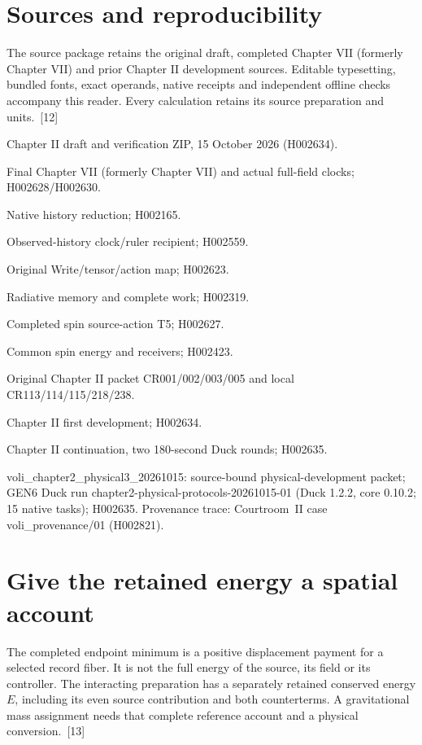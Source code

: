 \documentclass[10pt,twocolumn,letterpaper]{article}
\begin{document}
\section{Sources and reproducibility}
The source package retains the original draft, completed Chapter VII (formerly Chapter VII) and prior Chapter II development sources. Editable typesetting, bundled fonts, exact operands, native receipts and independent offline checks accompany this reader. Every calculation retains its source preparation and units.~[12]

\begingroup\footnotesize\raggedright
\noindent[1] Chapter II draft and verification ZIP, 15 October 2026 (H002634).

\noindent[2] Final Chapter VII (formerly Chapter VII) and actual full-field clocks; H002628/H002630.

\noindent[3] Native history reduction; H002165.

\noindent[4] Observed-history clock/ruler recipient; H002559.

\noindent[5] Original Write/tensor/action map; H002623.

\noindent[6] Radiative memory and complete work; H002319.

\noindent[7] Completed spin source-action T5; H002627.

\noindent[8] Common spin energy and receivers; H002423.

\noindent[9] Original Chapter II packet CR001/002/003/005 and local CR113/114/115/218/238.

\noindent[10] Chapter II first development; H002634.

\noindent[11] Chapter II continuation, two 180-second Duck rounds; H002635.

\noindent[12] voli\_chapter2\_physical3\_20261015: source-bound physical-development packet; GEN6 Duck run chapter2-physical-protocols-20261015-01 (Duck 1.2.2, core 0.10.2; 15 native tasks); H002635. Provenance trace: Courtroom~II case voli\_provenance/01 (H002821).

\par\endgroup


\section{Give the retained energy a spatial account}
The completed endpoint minimum is a positive displacement payment for a selected record fiber. It is not the full energy of the source, its field or its controller. The interacting preparation has a separately retained conserved energy $E$, including its even source contribution and both counterterms. A gravitational mass assignment needs that complete reference account and a physical conversion.~[13]
\end{document}
